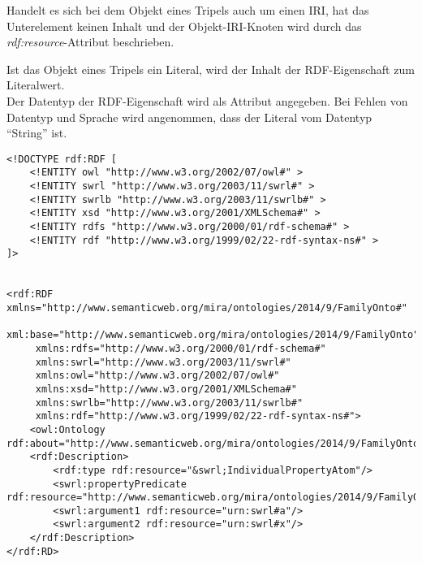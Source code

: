 Handelt es sich bei dem Objekt eines Tripels auch um einen IRI, hat das Unterelement keinen Inhalt und der Objekt-IRI-Knoten wird durch das \textit{rdf:resource}-Attribut beschrieben.

Ist das Objekt eines Tripels ein Literal, wird der Inhalt der RDF-Eigenschaft zum Literalwert.\\
Der Datentyp der RDF-Eigenschaft wird als Attribut angegeben. Bei Fehlen von Datentyp und Sprache wird angenommen, dass der Literal vom Datentyp ``String'' ist.

\begin{lstlisting}[caption={Beispiel RDF-Elemente\protect\footnotemark}]
<!DOCTYPE rdf:RDF [
    <!ENTITY owl "http://www.w3.org/2002/07/owl#" >
    <!ENTITY swrl "http://www.w3.org/2003/11/swrl#" >
    <!ENTITY swrlb "http://www.w3.org/2003/11/swrlb#" >
    <!ENTITY xsd "http://www.w3.org/2001/XMLSchema#" >
    <!ENTITY rdfs "http://www.w3.org/2000/01/rdf-schema#" >
    <!ENTITY rdf "http://www.w3.org/1999/02/22-rdf-syntax-ns#" >
]>


<rdf:RDF xmlns="http://www.semanticweb.org/mira/ontologies/2014/9/FamilyOnto#"
     xml:base="http://www.semanticweb.org/mira/ontologies/2014/9/FamilyOnto"
     xmlns:rdfs="http://www.w3.org/2000/01/rdf-schema#"
     xmlns:swrl="http://www.w3.org/2003/11/swrl#"
     xmlns:owl="http://www.w3.org/2002/07/owl#"
     xmlns:xsd="http://www.w3.org/2001/XMLSchema#"
     xmlns:swrlb="http://www.w3.org/2003/11/swrlb#"
     xmlns:rdf="http://www.w3.org/1999/02/22-rdf-syntax-ns#">
    <owl:Ontology rdf:about="http://www.semanticweb.org/mira/ontologies/2014/9/FamilyOnto"/>
    <rdf:Description>
        <rdf:type rdf:resource="&swrl;IndividualPropertyAtom"/>
        <swrl:propertyPredicate rdf:resource="http://www.semanticweb.org/mira/ontologies/2014/9/FamilyOnto#isAncestor"/>
        <swrl:argument1 rdf:resource="urn:swrl#a"/>
        <swrl:argument2 rdf:resource="urn:swrl#x"/>
    </rdf:Description>
</rdf:RD>
\end{lstlisting}
